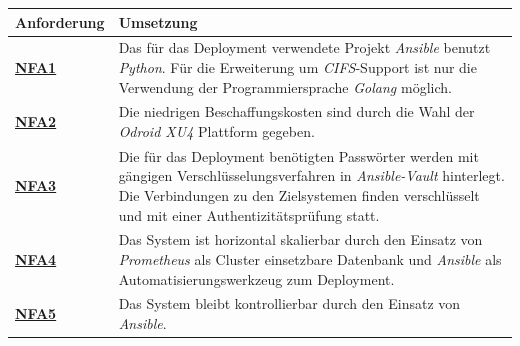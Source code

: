 \documentclass[titlepage]{report}
\begin{document}
\begin{center}
    \begin{tabu}{X[-1] X}
\toprule
\textbf{Anforderung} & \textbf{Umsetzung}  \\
\midrule
        \hyperref[table:NFA1]{\textbf{NFA1}} & Das für das Deployment verwendete Projekt \emph{Ansible} benutzt \emph{Python}. Für die Erweiterung um \emph{CIFS}\hyp{}Support ist nur die Verwendung der Programmiersprache \emph{Golang} möglich. \\
        \hyperref[table:NFA2]{\textbf{NFA2}} & Die niedrigen Beschaffungskosten sind durch die Wahl der \emph{Odroid XU4} Plattform gegeben. \\
        \hyperref[table:NFA3]{\textbf{NFA3}} & Die für das Deployment benötigten Passwörter werden mit gängigen Verschlüsselungsverfahren in \emph{Ansible-Vault}  hinterlegt. Die Verbindungen zu den Zielsystemen finden verschlüsselt und mit einer Authentizitätsprüfung statt. \\
        \hyperref[table:NFA4]{\textbf{NFA4}} & Das System ist horizontal skalierbar durch den Einsatz von \emph{Prometheus} als Cluster einsetzbare Datenbank und \emph{Ansible} als Automatisierungswerkzeug zum Deployment. \\
        \hyperref[table:NFA5]{\textbf{NFA5}} & Das System bleibt kontrollierbar durch den Einsatz von \emph{Ansible}. \\
\bottomrule
    \end{tabu}
    \label{table:mapping2}
\end{center}
\end{document}

